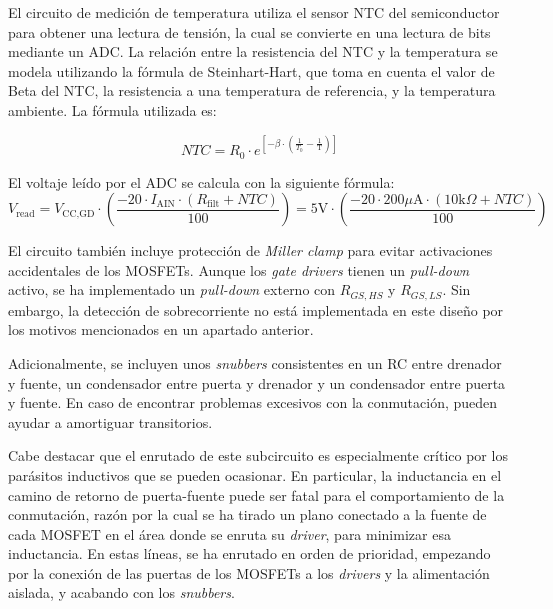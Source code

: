 El circuito de medición de temperatura utiliza el sensor NTC del semiconductor para obtener una lectura de tensión, la cual se convierte en una lectura de bits mediante un ADC. La relación entre la resistencia del NTC y la temperatura se modela utilizando la fórmula de Steinhart-Hart, que toma en cuenta el valor de Beta del NTC, la resistencia a una temperatura de referencia, y la temperatura ambiente. La fórmula utilizada es:

\[
NTC = R_0 \cdot e^{\left[-\beta \cdot \left(\frac{1}{T_0} - \frac{1}{\text{T}}\right)\right]}
\]

El voltaje leído por el ADC se calcula con la siguiente fórmula:
\[
V_{\text{read}} = V_{\text{CC,GD}} \cdot \left(\frac{-20 \cdot I_{\text{AIN}} \cdot (R_{\text{filt}} + NTC)}{100}\right) = 5 \text{V} \cdot \left(\frac{-20 \cdot 200 \mu\text{A} \cdot (10 \text{k}\Omega + NTC)}{100}\right)
\]

El circuito también incluye protección de \textit{Miller clamp} para evitar activaciones accidentales de los MOSFETs. Aunque los \textit{gate drivers} tienen un \textit{pull-down} activo, se ha implementado un \textit{pull-down} externo con $R_{GS,HS}$ y $R_{GS,LS}$. Sin embargo, la detección de sobrecorriente no está implementada en este diseño por los motivos mencionados en un apartado anterior.

Adicionalmente, se incluyen unos \textit{snubbers} consistentes en un RC entre drenador y fuente, un condensador entre puerta y drenador y un condensador entre puerta y fuente. En caso de encontrar problemas excesivos con la conmutación, pueden ayudar a amortiguar transitorios.

Cabe destacar que el enrutado de este subcircuito es especialmente crítico por los parásitos inductivos que se pueden ocasionar. En particular, la inductancia en el camino de retorno de puerta-fuente puede ser fatal para el comportamiento de la conmutación, razón por la cual se ha tirado un plano conectado a la fuente de cada MOSFET en el área donde se enruta su \textit{driver}, para minimizar esa inductancia. En estas líneas, se ha enrutado en orden de prioridad, empezando por la conexión de las puertas de los MOSFETs a los \textit{drivers} y la alimentación aislada, y acabando con los \textit{snubbers}.

